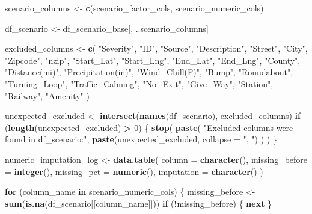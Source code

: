 \documentclass[
]{article}
\newenvironment{Shaded}{\begin{snugshade}}{\end{snugshade}}
\newcommand{\AttributeTok}[1]{\textcolor[rgb]{0.13,0.29,0.53}{#1}}
\newcommand{\ControlFlowTok}[1]{\textcolor[rgb]{0.13,0.29,0.53}{\textbf{#1}}}
\newcommand{\DecValTok}[1]{\textcolor[rgb]{0.00,0.00,0.81}{#1}}
\newcommand{\FunctionTok}[1]{\textcolor[rgb]{0.13,0.29,0.53}{\textbf{#1}}}
\newcommand{\NormalTok}[1]{#1}
\newcommand{\OtherTok}[1]{\textcolor[rgb]{0.56,0.35,0.01}{#1}}
\newcommand{\SpecialCharTok}[1]{\textcolor[rgb]{0.81,0.36,0.00}{\textbf{#1}}}
\newcommand{\StringTok}[1]{\textcolor[rgb]{0.31,0.60,0.02}{#1}}
\begin{document}
\begin{Shaded}
\begin{Highlighting}[]
\NormalTok{scenario\_columns }\OtherTok{\textless{}{-}} \FunctionTok{c}\NormalTok{(scenario\_factor\_cols, scenario\_numeric\_cols)}

\NormalTok{df\_scenario }\OtherTok{\textless{}{-}}\NormalTok{ df\_scenario\_base[, ..scenario\_columns]}

\NormalTok{excluded\_columns }\OtherTok{\textless{}{-}} \FunctionTok{c}\NormalTok{(}
  \StringTok{"Severity"}\NormalTok{, }\StringTok{"ID"}\NormalTok{, }\StringTok{"Source"}\NormalTok{, }\StringTok{"Description"}\NormalTok{, }\StringTok{"Street"}\NormalTok{, }\StringTok{"City"}\NormalTok{, }\StringTok{"Zipcode"}\NormalTok{, }\StringTok{"nzip"}\NormalTok{,}
  \StringTok{"Start\_Lat"}\NormalTok{, }\StringTok{"Start\_Lng"}\NormalTok{, }\StringTok{"End\_Lat"}\NormalTok{, }\StringTok{"End\_Lng"}\NormalTok{, }\StringTok{"County"}\NormalTok{, }\StringTok{"Distance(mi)"}\NormalTok{,}
  \StringTok{"Precipitation(in)"}\NormalTok{, }\StringTok{"Wind\_Chill(F)"}\NormalTok{, }\StringTok{"Bump"}\NormalTok{, }\StringTok{"Roundabout"}\NormalTok{, }\StringTok{"Turning\_Loop"}\NormalTok{,}
  \StringTok{"Traffic\_Calming"}\NormalTok{, }\StringTok{"No\_Exit"}\NormalTok{, }\StringTok{"Give\_Way"}\NormalTok{, }\StringTok{"Station"}\NormalTok{, }\StringTok{"Railway"}\NormalTok{, }\StringTok{"Amenity"}
\NormalTok{)}

\NormalTok{unexpected\_excluded }\OtherTok{\textless{}{-}} \FunctionTok{intersect}\NormalTok{(}\FunctionTok{names}\NormalTok{(df\_scenario), excluded\_columns)}
\ControlFlowTok{if}\NormalTok{ (}\FunctionTok{length}\NormalTok{(unexpected\_excluded) }\SpecialCharTok{\textgreater{}} \DecValTok{0}\NormalTok{) \{}
  \FunctionTok{stop}\NormalTok{(}
    \FunctionTok{paste}\NormalTok{(}
      \StringTok{"Excluded columns were found in df\_scenario:"}\NormalTok{,}
      \FunctionTok{paste}\NormalTok{(unexpected\_excluded, }\AttributeTok{collapse =} \StringTok{", "}\NormalTok{)}
\NormalTok{    )}
\NormalTok{  )}
\NormalTok{\}}

\NormalTok{numeric\_imputation\_log }\OtherTok{\textless{}{-}} \FunctionTok{data.table}\NormalTok{(}
  \AttributeTok{column =} \FunctionTok{character}\NormalTok{(),}
  \AttributeTok{missing\_before =} \FunctionTok{integer}\NormalTok{(),}
  \AttributeTok{missing\_pct =} \FunctionTok{numeric}\NormalTok{(),}
  \AttributeTok{imputation =} \FunctionTok{character}\NormalTok{()}
\NormalTok{)}

\ControlFlowTok{for}\NormalTok{ (column\_name }\ControlFlowTok{in}\NormalTok{ scenario\_numeric\_cols) \{}
\NormalTok{  missing\_before }\OtherTok{\textless{}{-}} \FunctionTok{sum}\NormalTok{(}\FunctionTok{is.na}\NormalTok{(df\_scenario[[column\_name]]))}
  \ControlFlowTok{if}\NormalTok{ (}\SpecialCharTok{!}\NormalTok{missing\_before) \{}
    \ControlFlowTok{next}
\NormalTok{  \}}


\end{Highlighting}
\end{Shaded}
\end{document}
